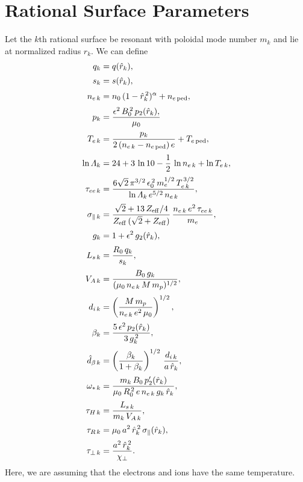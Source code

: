 \documentclass[12pt,prb,aps,notitlepage]{revtex4-1}
\begin{document}
\section{Rational Surface Parameters}
Let the $k$th rational surface be resonant with poloidal mode number $m_k$ and lie at normalized radius $\hat{r}_k$. 
We can define
\begin{align}
q_k &= q(\hat{r}_k),\\[0.5ex]
s_k&= s(\hat{r}_k),\\[0.5ex]
n_{e\,k} &= n_0\,(1-\hat{r}_k^{\,2})^\alpha + n_{e\,{\rm ped}},\\[0.5ex]
p_k &= \frac{\epsilon^2\,B_0^{\,2}\,p_2(\hat{r}_k),}{\mu_0}\\[0.5ex]
T_{e\,k} &= \frac{p_k}{2\,(n_{e\,k}-n_{e\,{\rm ped}})\,e}+ T_{e\,{\rm ped}},\\[0.5ex]
\ln{\mit\Lambda}_k &= 24 + 3\,\ln 10-\frac{1}{2}\,\ln n_{e\,k} + \ln T_{e\,k},\\[0.5ex]
\tau_{ee\,k}&= \frac{6\sqrt{2}\,\pi^{3/2}\,\epsilon_0^{\,2}\,m_e^{1/2}\,T_{e\,k}^{\,3/2}}{\ln{\mit\Lambda}_k\,e^{5/2}\,n_{e\,k}},\\[0.5ex]
\sigma_{\parallel\,k} &= \frac{\sqrt{2}+13\,Z_{\rm eff}/4}{Z_{\rm eff}\,(\sqrt{2}+Z_{\rm eff})}\,\frac{n_{e\,k}\,e^2\,\tau_{ee\,k}}{m_e},\\[0.5ex]
g_k &= 1+ \epsilon^2\,g_2(\hat{r}_k),\\[0.5ex]
L_{s\,k} &= \frac{R_0\,q_k}{s_k},\\[0.5ex]
V_{A\,k} &= \frac{B_0\,g_k}{(\mu_0\,n_{e\,k}\,M\,m_p)^{1/2}},\\[0.5ex]
d_{i\,k} &= \left(\frac{M\,m_p}{n_{e\,k}\,e^2\,\mu_0}\right)^{1/2},\\[0.5ex]
\beta_k &= \frac{5\,\epsilon^2\,p_2(\hat{r}_k)}{3\,g_k^{\,2}},\\[0.5ex]
\hat{d}_{\beta\,k} &= \left(\frac{\beta_k}{1+\beta_k}\right)^{1/2}\,\frac{d_{i\,k}}{a\,\hat{r}_k},\\[0.5ex]
\omega_{\ast\,k} &= \frac{m_k\,B_0\,p_2'(\hat{r}_k)}{\mu_0\,R_0^{\,2}\,e\,n_{e\,k}\,g_k\,\hat{r}_k}, \\[0.5ex]
\tau_{H\,k} &= \frac{L_{s\,k}}{m_k\,V_{A\,k}},\\[0.5ex]
\tau_{R\,k} &= \mu_0\,a^2\,\hat{r}_k^{\,2}\,\sigma_\parallel(\hat{r}_k),\\[0.5ex]
\tau_{\perp\,k} &= \frac{a^2\,\hat{r}_k^{\,2}}{\chi_\perp}.
\end{align}
Here, we are assuming that the electrons and ions have the same temperature. 
\end{document}
